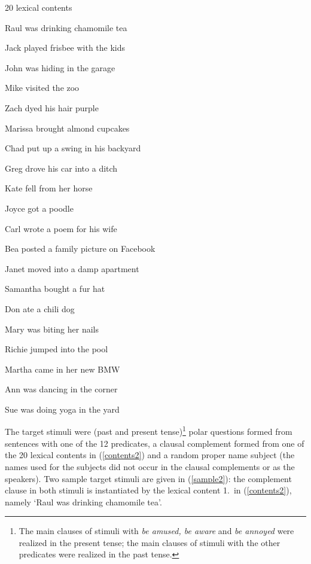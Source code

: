 \documentclass[11pt,fleqn]{article}
\newcommand{\6}{\mbox{$[\hspace*{-.6mm}[$}}
\newcommand{\9}{\mbox{$]\hspace*{-.6mm}]$}}
\begin{document}
\begin{exe}
\ex\label{contents2} 20 lexical contents

\begin{enumerate}[itemsep=-.5mm]

\begin{multicols}{2}
\item Raul was drinking chamomile tea
\item Jack played frisbee with the kids
\item John was hiding in the garage
\item Mike visited the zoo
\item Zach dyed his hair purple
\item Marissa brought almond cupcakes
\item Chad put up a swing in his backyard
\item Greg drove his car into a ditch
\item Kate fell from her horse
\item Joyce got a poodle 
\columnbreak
\item Carl wrote a poem for his wife
\item Bea posted a family picture on Facebook
\item Janet moved into a damp apartment
\item Samantha bought a fur hat
\item Don ate a chili dog
\item Mary was biting her nails
\item Richie jumped into the pool
\item Martha came in her new BMW
\item Ann was dancing in the corner
\item Sue was doing yoga in the yard
\end{multicols}
\end{enumerate}

\end{exe}

The target stimuli were (past and present tense)\footnote{The main clauses of stimuli with {\em be amused, be aware} and {\em be annoyed} were realized in the present tense; the main clauses of stimuli with the other predicates were realized in the past tense.} polar questions formed from sentences with one of the 12 predicates, a clausal complement formed from one of the 20 lexical contents in  (\ref{contents2}) and a random proper name subject (the names used for the subjects did not occur in the clausal complements or as the speakers). Two sample target stimuli are given in (\ref{sample2}): the complement clause in both stimuli is instantiated by the lexical content 1.\ in (\ref{contents2}), namely `Raul was drinking chamomile tea'.
\end{document}
